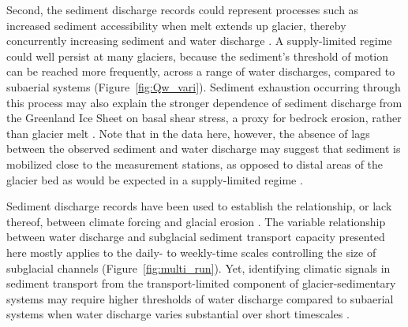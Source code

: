 \documentclass[11pt]{article}
\begin{document}
Second, the sediment discharge records could represent processes such as increased sediment accessibility when melt extends up glacier, thereby concurrently increasing sediment and water discharge \citep[e.g.][]{vergara2022}.
A supply-limited regime could well persist at many glaciers, because the sediment's threshold of motion can be reached more frequently, across a range of water discharges, compared to subaerial systems (Figure~\ref{fig:Qw_vari}).
Sediment exhaustion occurring through this process may also explain the stronger dependence of sediment discharge from the Greenland Ice Sheet on basal shear stress, a proxy for bedrock erosion, rather than glacier melt \citep{overeem2017}.
Note that in the data here, however, the absence of lags between the observed sediment and water discharge may suggest that sediment is mobilized close to the measurement stations, as opposed to distal areas of the glacier bed as would be expected in a supply-limited regime \citep[Figure~\ref{fig:model_outs}\, a and e; ][]{williams1989}.


Sediment discharge records have been used to establish the relationship, or lack thereof, between climate forcing and glacial erosion \citep[e.g.][]{koppes2009a,ganti2016,willenbring2016,mariotti2021}.
The variable relationship between water discharge and subglacial sediment transport capacity presented here mostly applies to the daily- to weekly-time scales controlling the size of subglacial channels (Figure~\ref{fig:multi_run}).
Yet, identifying climatic signals in sediment transport from the transport-limited component of glacier-sedimentary systems may require higher thresholds of water discharge compared to subaerial systems when water discharge varies substantial over short timescales \citep[Figure~\ref{fig:Qw_vari}; ][]{tofelde2021}.
\end{document}
